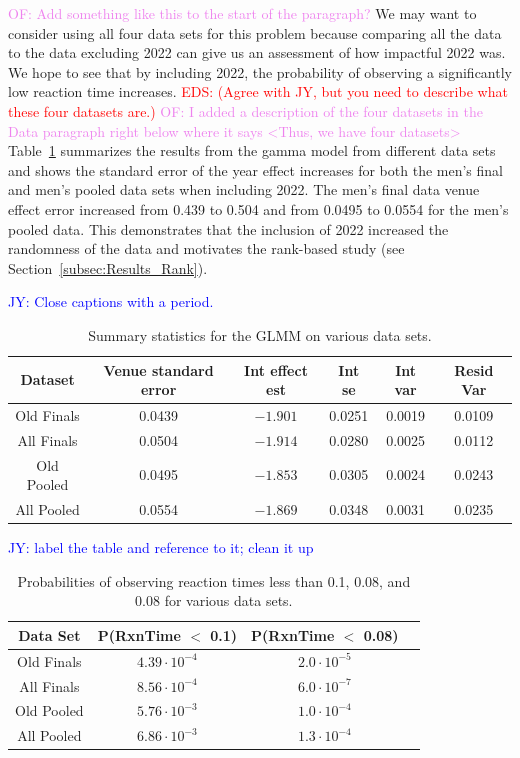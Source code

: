 \documentclass[12pt, letterpaper, titlepage]{article}
\newcommand{\jy}[1]{\textcolor{blue}{JY: #1}}
\newcommand{\eds}[1]{\textcolor{red}{EDS: (#1)}}
\newcommand{\of}[1]{\textcolor{violet}{OF: #1}}
\begin{document}
\of{Add something like this to the start of the paragraph?}
We may want to consider using all four data sets for this problem because
comparing all the data to the data excluding 2022 can give us an
assessment of how impactful 2022 was. We hope to see that by including 2022,
the probability of observing a significantly low reaction time increases. 
\eds{Agree with JY, but you need to describe what these four datasets are.}
\of{I added a description of the four datasets in the Data paragraph right below
where it says <Thus, we have four datasets>}
Table~\ref{tab:Gamma_parameters} summarizes the results from the gamma model 
from different data sets and shows the standard error of the year
effect increases for both the men's final and men's pooled data sets when
including 2022.  The men's final data venue effect error increased from 0.439
to 0.504 and from 0.0495 to 0.0554 for the men's pooled data.  This demonstrates
that the inclusion of 2022 increased the randomness of the data and motivates
the rank-based study (see Section~\ref{subsec:Results_Rank}).

\jy{Close captions with a period.}
\begin{table}
  \centering
  \caption{Summary statistics for the GLMM on various data sets.} 
  \begin{tabular}{c c c c c c}
      \toprule
      Dataset & Venue standard error & Int effect est & Int se & Int var & Resid Var \\
      \midrule
      Old Finals & 0.0439 & $-1.901$ & 0.0251 & 0.0019 & 0.0109 \\
      All Finals & 0.0504 & $-1.914$ & 0.0280 & 0.0025 & 0.0112 \\
      Old Pooled & 0.0495 & $-1.853$ & 0.0305 & 0.0024 & 0.0243 \\
      All Pooled & 0.0554 & $-1.869$ & 0.0348 & 0.0031 & 0.0235 \\
      \bottomrule
  \end{tabular}
  \label{tab:Gamma_parameters}
\end{table}


\jy{label the table and reference to it; clean it up}
\begin{table}
  \centering
  \caption{Probabilities of observing reaction times less than 0.1, 0.08, and
  0.08 for various data sets.}
  \begin{tabular}{c c c c} 
   \toprule
   Data Set & P(RxnTime $<$ 0.1) & P(RxnTime $<$ 0.08) \\ 
   \midrule
   Old Finals & $4.39\cdot10^{-4}$ & $2.0\cdot10^{-5}$ \\
   All Finals & $8.56\cdot10^{-4}$ & $6.0\cdot10^{-7}$ \\
   Old Pooled & $5.76\cdot10^{-3}$ & $1.0\cdot10^{-4}$ \\ 
   All Pooled & $6.86\cdot10^{-3}$ & $1.3\cdot10^{-4}$ \\
   \bottomrule
  \end{tabular}
  \label{tab:Sim_probability}
\end{table}
\end{document}
